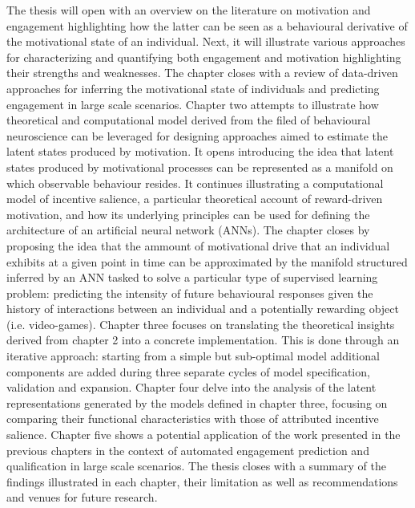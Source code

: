 The thesis will open with an overview on the literature on motivation and engagement highlighting how the latter can be seen as a behavioural derivative of the motivational state of an individual. Next, it will illustrate various approaches for characterizing and quantifying both engagement and motivation highlighting their strengths and weaknesses. The chapter closes with a review of data-driven approaches for inferring the motivational state of individuals and predicting engagement in large scale scenarios. Chapter two attempts to illustrate how theoretical and computational model derived from the filed of behavioural neuroscience can be leveraged for designing approaches aimed to estimate the latent states produced by motivation. It opens introducing the idea that latent states produced by motivational processes can be represented as a manifold on which observable behaviour resides. It continues illustrating a computational model of incentive salience, a particular theoretical account of reward-driven motivation, and how its underlying principles can be used for defining the architecture of an artificial neural network (ANNs). The chapter closes by proposing the idea that the ammount of motivational drive that an individual exhibits at a given point in time can be approximated by the manifold structured inferred by an ANN tasked to solve a particular type of supervised learning problem: predicting the intensity of future behavioural responses given the history of interactions between an individual and a potentially rewarding object (i.e. video-games). Chapter three focuses on translating the theoretical insights derived from chapter 2 into a concrete implementation. This is done through an iterative approach: starting from a simple but sub-optimal model additional components are added during three separate cycles of model specification, validation and expansion. Chapter four delve into the analysis of the latent representations generated by the models defined in chapter three, focusing on comparing their functional characteristics with those of attributed incentive salience. Chapter five shows a potential application of the work presented in the previous chapters in the context of automated engagement prediction and qualification in large scale scenarios. The thesis closes with a summary of the findings illustrated in each chapter, their limitation as well as recommendations and venues for future research.



